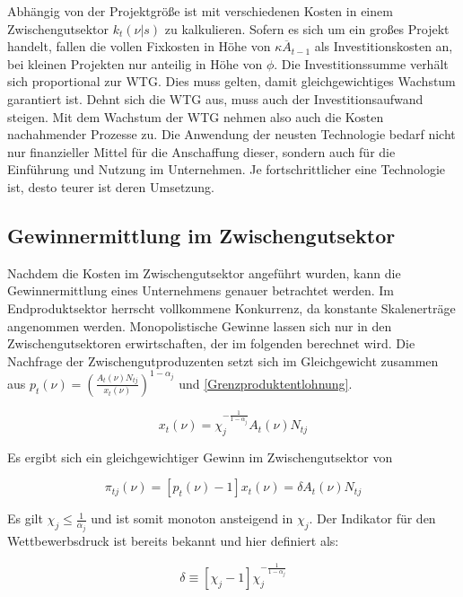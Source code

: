 Abhängig von der Projektgrö{\ss}e ist mit verschiedenen Kosten in einem Zwischengutsektor $k_t(\nu|s)$ zu kalkulieren. Sofern es sich um ein gro{\ss}es Projekt handelt, fallen die vollen Fixkosten in Höhe von $\kappa\overline{A}_{t-1}$ als Investitionskosten an, bei kleinen Projekten nur anteilig in Höhe von $\phi$. Die Investitionssumme verhält sich proportional zur WTG. Dies muss gelten, damit gleichgewichtiges Wachstum garantiert ist. Dehnt sich die WTG aus, muss auch der Investitionsaufwand steigen. Mit dem Wachstum der WTG nehmen also auch die Kosten nachahmender Prozesse zu. Die Anwendung der neusten Technologie bedarf nicht nur finanzieller Mittel für die Anschaffung dieser, sondern auch für die Einführung und Nutzung im Unternehmen. Je fortschrittlicher eine Technologie ist, desto teurer ist deren Umsetzung.


\subsection{Gewinnermittlung im Zwischengutsektor}\label{sec:Gewinnermittlung Zwischengutsektor}
Nachdem die Kosten im Zwischengutsektor angeführt wurden, kann die Gewinnermittlung eines Unternehmens genauer betrachtet werden. Im Endproduktsektor herrscht vollkommene Konkurrenz, da konstante Skalenerträge angenommen werden. Monopolistische Gewinne lassen sich nur in den Zwischengutsektoren erwirtschaften, der im folgenden berechnet wird. Die Nachfrage der Zwischengutproduzenten setzt sich im Gleichgewicht zusammen aus $p_t(\nu)=\left(\frac{A_t(\nu)N_{tj}}{x_t(\nu)}\right)^{1-\alpha_j}$ und \eqref{Grenzproduktentlohnung}.


	\begin{equation*}
		x_t(\nu)=\chi_j^{-\frac{1}{1-\alpha_j}}A_t(\nu)N_{tj}\label{gleichgewichtige Nachfrage}
	\end{equation*}


Es ergibt sich ein gleichgewichtiger Gewinn im Zwischengutsektor von


	\begin{equation}
		\pi_{tj}(\nu)=[p_t(\nu)-1]x_t(\nu)=\delta A_t(\nu)N_{tj}\label{Gewinn Zwischengutsektor}
	\end{equation}

Es gilt $\chi_j\leq\frac{1}{\alpha_j}$ und ist somit monoton ansteigend in $\chi_j$. Der Indikator für den Wettbewerbsdruck ist bereits bekannt und hier definiert als: 


	\begin{equation}
		\delta\equiv[\chi_j-1]\chi_j^{-\frac{1}{1-\alpha_j}}
	\end{equation}


